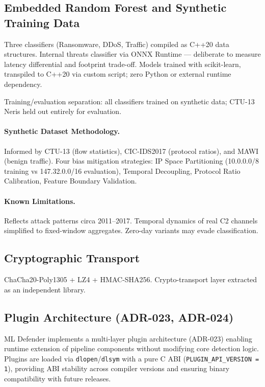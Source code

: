 \documentclass[11pt,a4paper]{article}
\begin{document}
    \subsection{Embedded Random Forest and Synthetic Training Data}

    Three classifiers (Ransomware, DDoS, Traffic) compiled as C++20 data structures. Internal
    threats classifier via ONNX Runtime --- deliberate to measure latency differential and
    footprint trade-off. Models trained with scikit-learn, transpiled to C++20 via custom script;
    zero Python or external runtime dependency.

    Training/evaluation separation: all classifiers trained on synthetic data; CTU-13 Neris held
    out entirely for evaluation.

    \paragraph{Synthetic Dataset Methodology.}
    Informed by CTU-13 (flow statistics), CIC-IDS2017 (protocol ratios), and MAWI (benign
    traffic). Four bias mitigation strategies: IP Space Partitioning (10.0.0.0/8 training vs
    147.32.0.0/16 evaluation), Temporal Decoupling, Protocol Ratio Calibration, Feature Boundary
    Validation.

    \paragraph{Known Limitations.}
    Reflects attack patterns circa 2011--2017. Temporal dynamics of real C2 channels simplified
    to fixed-window aggregates. Zero-day variants may evade classification.

    \subsection{Cryptographic Transport}
    ChaCha20-Poly1305 + LZ4 + HMAC-SHA256. Crypto-transport layer extracted as an independent
    library.

    \subsection{Plugin Architecture (ADR-023, ADR-024)}

    ML Defender implements a multi-layer plugin architecture (ADR-023) enabling runtime extension
    of pipeline components without modifying core detection logic. Plugins are loaded via
    \texttt{dlopen}/\texttt{dlsym} with a pure C ABI (\texttt{PLUGIN\_API\_VERSION = 1}),
    providing ABI stability across compiler versions and ensuring binary compatibility with
    future releases.
\end{document}
